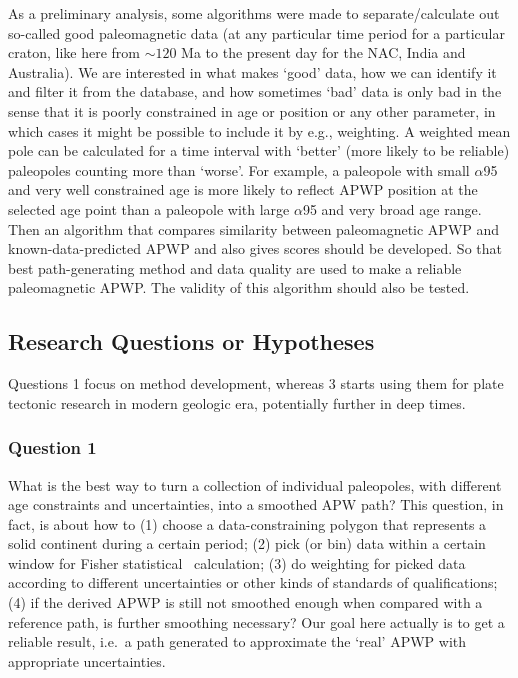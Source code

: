 As a preliminary analysis, some algorithms were made to separate/calculate out
so-called good paleomagnetic data (at any particular time period for a
particular craton, like here from ${\sim}120$ Ma to the present day for the
NAC, India and Australia). We are interested in what makes `good' data, how we
can identify it and
filter it from the database, and how sometimes `bad' data is only bad in the
sense that it is poorly constrained in age or position or any other parameter,
in which cases it might be possible to include it by e.g., weighting. A weighted
mean pole can be calculated for a time interval with `better' (more likely to be
reliable) paleopoles counting more than `worse'. For example, a paleopole with
small $\alpha$95 and very well constrained age is more likely to reflect APWP
position at the selected age point than a paleopole with large $\alpha$95 and
very broad age range. Then an algorithm that compares similarity between
paleomagnetic APWP and known-data-predicted APWP and also gives scores should be
developed. So that best path-generating method and data quality are used to
make a reliable paleomagnetic APWP\@. The validity of this algorithm should also
be tested.

\subsection{Research Questions or Hypotheses}

Questions 1 focus on method development, whereas 3 starts
using them for plate tectonic research in modern geologic era, potentially
further in deep times.

\subsubsection{Question 1}

What is the best way to turn a collection of individual paleopoles, with
different age constraints and uncertainties, into a smoothed APW path? This
question, in fact, is about how to (1) choose a data-constraining polygon that
represents a solid continent during a certain period; (2) pick (or bin) data
within a certain window for Fisher statistical~\citep{F53} calculation; (3) do
weighting for picked data according to different uncertainties or other kinds of
standards of qualifications; (4) if the derived APWP is still not smoothed
enough when compared with a reference path, is further smoothing necessary? Our
goal here actually is to get a reliable result, i.e.\ a path generated to
approximate the `real' APWP with appropriate uncertainties.

